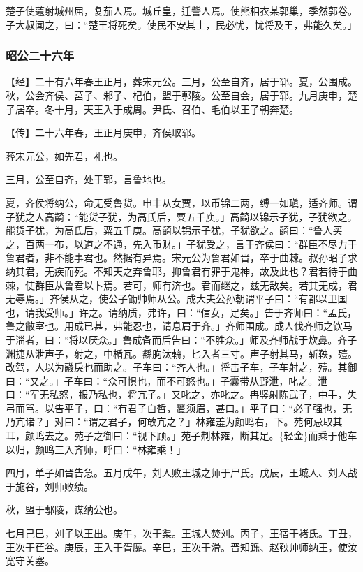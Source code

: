 \documentclass[]{article}
\begin{document}
楚子使薳射城州屈，复茄人焉。城丘皇，迁訾人焉。使熊相衣某郭巢，季然郭卷。子大叔闻之，曰：``楚王将死矣。使民不安其土，民必忧，忧将及王，弗能久矣。」

\hypertarget{header-n2787}{%
\subsubsection{昭公二十六年}\label{header-n2787}}

【经】二十有六年春王正月，葬宋元公。三月，公至自齐，居于郓。夏，公围成。秋，公会齐侯、莒子、邾子、杞伯，盟于鄟陵。公至自会，居于郓。九月庚申，楚子居卒。冬十月，天王入于成周。尹氏、召伯、毛伯以王子朝奔楚。

【传】二十六年春，王正月庚申，齐侯取郓。

葬宋元公，如先君，礼也。

三月，公至自齐，处于郓，言鲁地也。

夏，齐侯将纳公，命无受鲁货。申丰从女贾，以币锦二两，缚一如瑱，适齐师。谓子犹之人高齮：``能货子犹，为高氏后，粟五千庾。」高齮以锦示子犹，子犹欲之。能货子犹，为高氏后，粟五千庚。高齮以锦示子犹，子犹欲之。齮曰：``鲁人买之，百两一布，以道之不通，先入币财。」子犹受之，言于齐侯曰：``群臣不尽力于鲁君者，非不能事君也。然据有异焉。宋元公为鲁君如晋，卒于曲棘。叔孙昭子求纳其君，无疾而死。不知天之弃鲁耶，抑鲁君有罪于鬼神，故及此也？君若待于曲棘，使群臣从鲁君以卜焉。若可，师有济也。君而继之，兹无敌矣。若其无成，君无辱焉。」齐侯从之，使公子锄帅师从公。成大夫公孙朝谓平子曰：``有都以卫国也，请我受师。」许之。请纳质，弗许，曰：``信女，足矣。」告于齐师曰：``孟氏，鲁之敝室也。用成已甚，弗能忍也，请息肩于齐。」齐师围成。成人伐齐师之饮马于淄者，曰：``将以厌众。」鲁成备而后告曰：``不胜众。」师及齐师战于炊鼻。齐子渊捷从泄声子，射之，中楯瓦。繇朐汰輈，匕入者三寸。声子射其马，斩鞅，殪。改驾，人以为鬷戾也而助之。子车曰：``齐人也。」将击子车，子车射之，殪。其御曰：``又之。」子车曰：``众可惧也，而不可怒也。」子囊带从野泄，叱之。泄曰：``军无私怒，报乃私也，将亢子。」又叱之，亦叱之。冉竖射陈武子，中手，失弓而骂。以告平子，曰：``有君子白皙，鬒须眉，甚口。」平子曰：``必子强也，无乃亢诸？」对曰：``谓之君子，何敢亢之？」林雍羞为颜鸣右，下。苑何忌取其耳，颜鸣去之。苑子之御曰：``视下顾。」苑子刜林雍，断其足。\{轻金\}而乘于他车以归，颜鸣三入齐师，呼曰：``林雍乘！」

四月，单子如晋告急。五月戊午，刘人败王城之师于尸氏。戊辰，王城人、刘人战于施谷，刘师败绩。

秋，盟于鄟陵，谋纳公也。

七月己巳，刘子以王出。庚午，次于渠。王城人焚刘。丙子，王宿于褚氏。丁丑，王次于萑谷。庚辰，王入于胥靡。辛巳，王次于滑。晋知跞、赵鞅帅师纳王，使汝宽守关塞。
\end{document}
